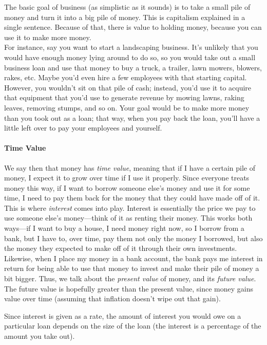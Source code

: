 \setcounter{ExampleCounter}{1}
The basic goal of business (as simplistic as it sounds) is to take a small pile of money and turn it into a big pile of money.  This is capitalism explained in a single sentence.  Because of that, there is value to holding money, because you can use it to make more money.\\  

For instance, say you want to start a landscaping business.  It's unlikely that you would have enough money lying around to do so, so you would take out a small business loan and use that money to buy a truck, a trailer, lawn mowers, blowers, rakes, etc.  Maybe you'd even hire a few employees with that starting capital.  However, you wouldn't sit on that pile of cash; instead, you'd use it to acquire that equipment that you'd use to generate revenue by mowing lawns, raking leaves, removing stumps, and so on.  Your goal would be to make more money than you took out as a loan; that way, when you pay back the loan, you'll have a little left over to pay your employees and yourself.

\paragraph{Time Value} We say then that money has \textit{time value}, meaning that if I have a certain pile of money, I expect it to grow over time if I use it properly.  Since everyone treats money this way, if I want to borrow someone else's money and use it for some time, I need to pay them back for the money that they could have made off of it.  This is where \textit{interest} comes into play.  Interest is essentially the price we pay to use someone else's money---think of it as renting their money.  This works both ways---if I want to buy a house, I need money right now, so I borrow from a bank, but I have to, over time, pay them not only the money I borrowed, but also the money they expected to make off of it through their own investments.  Likewise, when I place my money in a bank account, the bank pays me interest in return for being able to use that money to invest and make their pile of money a bit bigger.  Thus, we talk about the \textit{present value} of money, and its \textit{future value}.  The future value is hopefully greater than the present value, since money gains value over time (assuming that inflation doesn't wipe out that gain).

Since interest is given as a rate, the amount of interest you would owe on a particular loan depends on the size of the loan (the interest is a percentage of the amount you take out).

